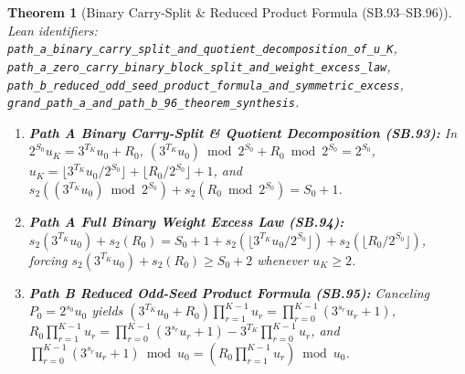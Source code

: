 \documentclass[11pt]{article}
\newtheorem{theorem}{Theorem}[section]
\begin{document}
\begin{theorem}[Binary Carry-Split \& Reduced Product Formula (SB.93--SB.96)]
\emph{Lean identifiers:} \nolinkurl{path_a_binary_carry_split_and_quotient_decomposition_of_u_K}, \nolinkurl{path_a_zero_carry_binary_block_split_and_weight_excess_law}, \nolinkurl{path_b_reduced_odd_seed_product_formula_and_symmetric_excess}, \nolinkurl{grand_path_a_and_path_b_96_theorem_synthesis}.
\begin{enumerate}
  \item \textbf{Path A Binary Carry-Split \& Quotient Decomposition (SB.93):} In $2^{S_0} u_K = 3^{T_K} u_0 + R_0$, $(3^{T_K} u_0) \bmod 2^{S_0} + R_0 \bmod 2^{S_0} = 2^{S_0}$, $u_K = \lfloor 3^{T_K} u_0 / 2^{S_0} \rfloor + \lfloor R_0 / 2^{S_0} \rfloor + 1$, and $s_2((3^{T_K} u_0) \bmod 2^{S_0}) + s_2(R_0 \bmod 2^{S_0}) = S_0 + 1$.
  \item \textbf{Path A Full Binary Weight Excess Law (SB.94):} $s_2(3^{T_K} u_0) + s_2(R_0) = S_0 + 1 + s_2(\lfloor 3^{T_K} u_0 / 2^{S_0} \rfloor) + s_2(\lfloor R_0 / 2^{S_0} \rfloor)$, forcing $s_2(3^{T_K} u_0) + s_2(R_0) \ge S_0 + 2$ whenever $u_K \ge 2$.
  \item \textbf{Path B Reduced Odd-Seed Product Formula (SB.95):} Canceling $P_0 = 2^{s_0} u_0$ yields $(3^{T_K} u_0 + R_0) \prod_{r=1}^{K-1} u_r = \prod_{r=0}^{K-1} (3^{s_r} u_r + 1)$, $R_0 \prod_{r=1}^{K-1} u_r = \prod_{r=0}^{K-1} (3^{s_r} u_r + 1) - 3^{T_K} \prod_{r=0}^{K-1} u_r$, and $\prod_{r=0}^{K-1} (3^{s_r} u_r + 1) \bmod u_0 = (R_0 \prod_{r=1}^{K-1} u_r) \bmod u_0$.
\end{enumerate}
\end{theorem}
\end{document}
